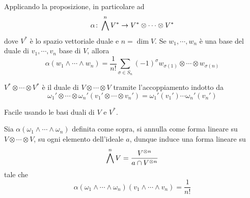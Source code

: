 \documentclass[a4paper]{article}
\begin{document}
Applicando la proposizione, in particolare ad
\[
    \alpha \colon \bigwedge^n V^* \to V^* \otimes \cdots \otimes V^*
\]
dove \(V^*\) è lo spazio vettoriale duale e \(n = \dim V\).
Se \(w_1, \cdots, w_n\) è una base del duale di \(v_1, \cdots, v_n\)
base di \(V\), allora
\[
    \alpha(w_1 \wedge \cdots \wedge w_n)
    = \frac{1}{n!} \sum_{\sigma \in S_n} (-1)^\sigma w_{\sigma(1)} \otimes \cdots \otimes w_{\sigma(n)}
\]

\begin{snippetlemma}{}
    \(V^* \otimes \cdots \otimes V^*\)
    è il duale di \(V \otimes \cdots \otimes V\)
    tramite l'accoppiamento indotto da
    \[
        \omega_1' \otimes \cdots \otimes \omega_n'
        \left(
            v_1' \otimes \cdots \otimes v_n'
        \right)
        = \omega_1'(v_1') \cdots \omega_n'(v_n')
    \]
\end{snippetlemma}

\begin{snippetproof}{}
    Facile usando le basi duali di \(V\) e \(V^*\).
\end{snippetproof}

\begin{snippetlemma}{}
    Sia \(\alpha(\omega_1 \wedge \cdots \wedge \omega_n)\)
    definita come sopra, si annulla come forma lineare
    su \(V \otimes \cdots \otimes V\),
    su ogni elemento dell'ideale
    \(a\), dunque induce una forma lineare
    su \[
        \bigwedge^n V = \frac{V^{\otimes n}}{a \cap V^{\otimes n}}
    \]
    tale che \[
        \alpha(\omega_1 \wedge \cdots \wedge \omega_n)
        (v_1 \wedge \cdots \wedge v_n) = \frac{1}{n!}
    \]
\end{snippetlemma}
\end{document}
